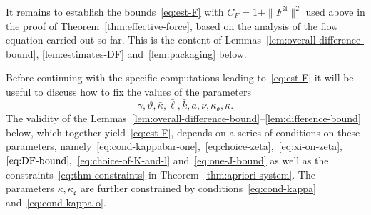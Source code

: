 \documentclass{article}
\numberwithin{equation}{section}
\theoremstyle{plain}
\theoremstyle{definition}
\begin{document}
It remains to establish the bounds~\eqref{eq:est-F} with
$C_F = 1 + \| F^{\mathfrak{A}} \|^2$ used above in the proof of
Theorem~\ref{thm:effective-force}, based on the analysis of the flow equation
carried out so far. This is the content of
Lemmas~\ref{lem:overall-difference-bound}, \ref{lem:estimates-DF}
and~\ref{lem:packaging} below.

Before continuing with the specific computations leading to~\eqref{eq:est-F}
it will be useful to discuss how to fix the values of the parameters
\[ \gamma, \vartheta, \bar{\kappa} , \bar{\ell}, \bar{k}, a,
   \nu, \kappa_{\mathfrak{o}}, \kappa . \]
The validity of the
Lemmas~\ref{lem:overall-difference-bound}--\ref{lem:difference-bound} below,
which together yield~\eqref{eq:est-F}, depends on a series of conditions on
these parameters,
namely~\eqref{eq:cond-kappabar-one},~\eqref{eq:choice-zeta},~\eqref{eq:xi-on-zeta},~$\eqref{eq:DF-bound},$~\eqref{eq:choice-of-K-and-l}
and~\eqref{eq:one-J-bound} as well as the
constraints~\eqref{eq:thm-constraints} in Theorem~\ref{thm:apriori-system}.
The parameters ${\kappa, \kappa_{\mathfrak{o}}} $ are further constrained by
conditions~\eqref{eq:cond-kappa} and~\eqref{eq:cond-kappa-o}.
\end{document}
